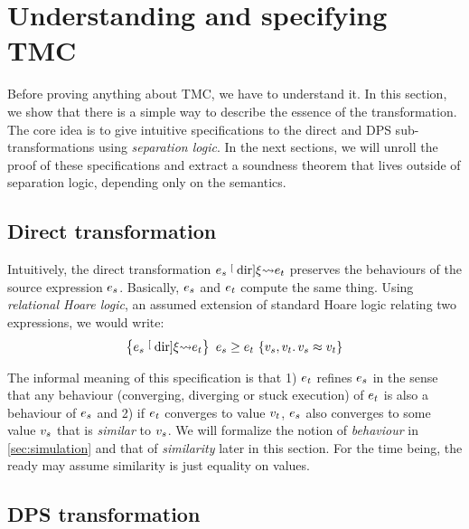 \section{Understanding and specifying TMC}
\label{sec:specification}

Before proving anything about TMC, we have to understand it.
In this section, we show that there is a simple way to describe the essence of the transformation.
The core idea is to give intuitive specifications to the direct and DPS sub-transformations using \emph{separation logic}.
In the next sections, we will unroll the proof of these specifications and extract a soundness theorem that lives outside of separation logic, depending only on the \DataLang semantics.

\subsection{Direct transformation}

Intuitively, the direct transformation $\datalangExpr_s \tmcDir{\datalangRenaming} \datalangExpr_t$ preserves the behaviours of the source expression $\datalangExpr_s$.
Basically, $\datalangExpr_s$ and $\datalangExpr_t$ compute the same thing.
Using \emph{relational Hoare logic}, an assumed extension of standard Hoare logic relating two expressions, we would write:
\[
    \iRsimvHoare{
        \datalangExpr_s \tmcDir{\datalangRenaming} \datalangExpr_t
    }{
        \datalangVal_s, \datalangVal_t \ldotp
        \datalangVal_s \iSimilar \datalangVal_t
    }{
        \datalangExpr_s
    }{
        \datalangExpr_t
    }
\]

The informal meaning of this specification is that 1) $\datalangExpr_t$ refines $\datalangExpr_s$ in the sense that any behaviour (converging, diverging or stuck execution) of $\datalangExpr_t$ is also a behaviour of $\datalangExpr_s$ and 2) if $\datalangExpr_t$ converges to value $\datalangVal_t$, $\datalangExpr_s$ also converges to some value $\datalangVal_s$ that is \emph{similar} to $\datalangVal_s$.
We will formalize the notion of \emph{behaviour} in \cref{sec:simulation} and that of \emph{similarity} later in this section.
For the time being, the ready may assume similarity is just equality on values.

\subsection{DPS transformation}

